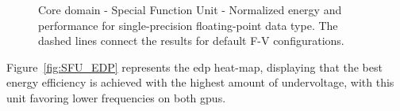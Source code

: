 
\begin{figure}[!htb]
    \centering
    \begin{subfigmatrix}{2}
      \label{fig:SFU_behaviour}
    \end{subfigmatrix}
    \caption{Core domain - Special Function Unit - Normalized energy and performance for single-precision floating-point data type. The dashed lines connect the results for default F-V configurations.}
\end{figure}

Figure~\ref{fig:SFU_EDP} represents the \acrshort{edp} heat-map, displaying that the best energy efficiency is achieved with the highest amount of undervoltage, with this unit favoring lower frequencies on both \acrshort{gpu}s.


